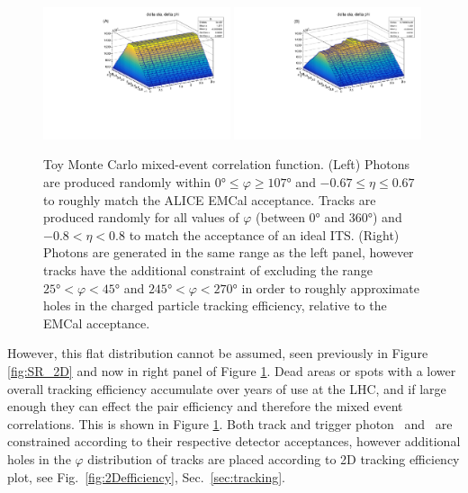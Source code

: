 \begin{figure}[htpb]
	\includegraphics[width=0.49\textwidth]{Data_Analysis/EventMixing/toy_MC_no_holes.pdf}
	\includegraphics[width=0.49\textwidth]{Data_Analysis/EventMixing/toy_MC_holes.pdf}
  \caption{Toy Monte Carlo mixed-event correlation function. (Left) Photons are produced randomly within $0\si{\degree{}}\leq \varphi \geq 107\si{\degree{}}$ and $ -0.67 \leq \eta \leq 0.67$ to roughly match the ALICE EMCal acceptance. Tracks are produced randomly for all values of $\varphi$ (between 0$\si{\degree{}}$ and 360$\si{\degree{}}$) and $-0.8 < \eta < 0.8$ to match the acceptance of an ideal ITS. (Right) Photons are generated in the same range as the left panel, however tracks have the additional constraint of excluding the range $ 25\si{\degree{}}< \varphi < 45\si{\degree{}}$ and $ 245\si{\degree{}} < \varphi < 270\si{\degree{}}$ in order to roughly approximate holes in the charged particle tracking efficiency, relative to the EMCal acceptance.} 
	\label{fig:toy_MC}
\end{figure}

However, this flat distribution cannot be assumed, seen previously in Figure \ref{fig:SR_2D} and now in right panel of Figure \ref{fig:toy_MC}. Dead areas or spots with a lower overall tracking efficiency accumulate over years of use at the LHC, and if large enough they can effect the pair efficiency and therefore the mixed event correlations. This is shown in Figure \ref{fig:toy_MC}. Both track and trigger photon \deltaeta~and \deltaphi~are constrained according to their respective detector acceptances, however additional holes in the $\varphi$ distribution of tracks are placed according to 2D tracking efficiency plot, see Fig.~\ref{fig:2Defficiency}, Sec.~\ref{sec:tracking}.

